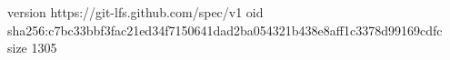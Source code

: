 version https://git-lfs.github.com/spec/v1
oid sha256:c7bc33bbf3fac21ed34f7150641dad2ba054321b438e8aff1c3378d99169cdfc
size 1305
